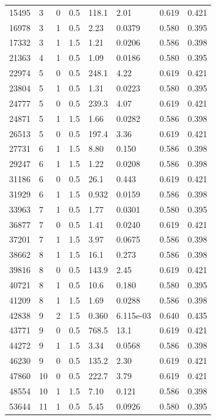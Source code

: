 \documentclass[preview]{standalone}
\begin{document}
{{\begin{tabular}{L{1.2cm}C{1.2cm} C{0.3cm}C{0.5cm} C{1.4cm}C{1.4cm} C{1.4cm}C{1.4cm}}
  15495  &     3  & 0     & 0.5 &  118.1  & 2.01  & 0.619 &  0.421   \\ 
  16978  &     3  & 1     & 0.5 &  2.23  & 0.0379  & 0.580 &  0.395   \\ 
  17332  &     3  & 1     & 1.5 &  1.21  & 0.0206  & 0.586 &  0.398   \\ 
  21363  &     4  & 1     & 0.5 &  1.09  & 0.0186  & 0.580 &  0.395   \\ 
  22974  &     5  & 0     & 0.5 &  248.1  & 4.22  & 0.619 &  0.421   \\ 
  23804  &     5  & 1     & 0.5 &  1.31  & 0.0223  & 0.580 &  0.395   \\ 
  24777  &     5  & 0     & 0.5 &  239.3  & 4.07  & 0.619 &  0.421   \\ 
  24871  &     5  & 1     & 1.5 &  1.66  & 0.0282  & 0.586 &  0.398   \\ 
  26513  &     5  & 0     & 0.5 &  197.4  & 3.36  & 0.619 &  0.421   \\ 
  27731  &     6  & 1     & 1.5 &  8.80  & 0.150  & 0.586 &  0.398   \\ 
  29247  &     6  & 1     & 1.5 &  1.22  & 0.0208  & 0.586 &  0.398   \\ 
  31186  &     6  & 0     & 0.5 &  26.1  & 0.443  & 0.619 &  0.421   \\ 
  31929  &     6  & 1     & 1.5 &  0.932  & 0.0159  & 0.586 &  0.398   \\ 
  33963  &     7  & 1     & 0.5 &  1.77  & 0.0301  & 0.580 &  0.395   \\ 
  36877  &     7  & 0     & 0.5 &  1.41  & 0.0240  & 0.619 &  0.421   \\ 
  37201  &     7  & 1     & 1.5 &  3.97  & 0.0675  & 0.586 &  0.398   \\ 
  38662  &     8  & 1     & 1.5 &  16.1  & 0.273  & 0.586 &  0.398   \\ 
  39816  &     8  & 0     & 0.5 &  143.9  & 2.45  & 0.619 &  0.421   \\ 
  40721  &     8  & 1     & 0.5 &  10.6  & 0.180  & 0.580 &  0.395   \\ 
  41209  &     8  & 1     & 1.5 &  1.69  & 0.0288  & 0.586 &  0.398   \\ 
  42838  &     9  & 2     & 1.5 &  0.360  & 6.115e-03  & 0.640 &  0.435   \\ 
  43771  &     9  & 0     & 0.5 &  768.5  & 13.1  & 0.619 &  0.421   \\ 
  44272  &     9  & 1     & 1.5 &  3.34  & 0.0568  & 0.586 &  0.398   \\ 
  46230  &     9  & 0     & 0.5 &  135.2  & 2.30  & 0.619 &  0.421   \\ 
  47860  &    10  & 0     & 0.5 &  222.7  & 3.79  & 0.619 &  0.421   \\ 
  48554  &    10  & 1     & 1.5 &  7.10  & 0.121  & 0.586 &  0.398   \\ 
  53644  &    11  & 1     & 0.5 &  5.45  & 0.0926  & 0.580 &  0.395   \\ 
\hline 
\end{tabular} 

}}
\end{document}
